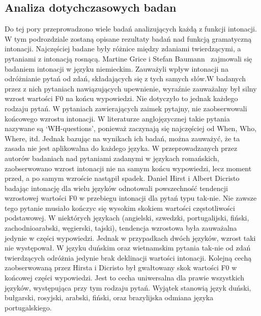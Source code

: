 \documentclass[a4paper,12 pt]{report}
\begin{document}
 

\subsection{Analiza dotychczasowych badan}
Do tej pory przeprowadzono wiele badań analizujących każdą z funkcji intonacji. W tym podrozdziale zostaną opisane rezultaty badań nad funkcją gramatyczną intonacji. Najczęściej badane były różnice między zdaniami twierdzącymi, a pytaniami z intonacją rosnącą.
\leavevmode
\newline
Martine Grice i Stefan Baumann~\cite{GRI-BA} zajmowali się badaniem intonacji w języku niemieckim. Zauważyli wpływ intonacji na odróżnianie pytań od zdań, składających się z tych samych słów.W badanych przez z nich pytaniach nawiązujących upewnienie, wyraźnie zauważalny był silny wzrost wartości F0 na końcu wypowiedzi. Nie dotyczyło to jednak każdego rodzaju pytań. W pytaniach zawierających zaimek pytajny, nie zaobserwowali końcowego wzrostu intonacji. W literaturze anglojęzycznej takie pytania nazywane są `WH-questions', ponieważ zaczynają się najczęściej od When, Who, Where, itd. Jednak bazując na wynikach ich badań, można zauważyć, że ta zasada nie jest aplikowalna do każdego języka. W przeprowadzanych przez autorów badaniach nad pytaniami zadanymi w językach romańskich, zaobserwowano wzrost intonacji nie na samym końcu wypowiedzi, lecz moment przed, a po samym wzroście nastąpił spadek.
\leavevmode
\newline
Daniel Hirst i Albert Dicristo~\cite{INT-SYS} badając intonację dla wielu języków odnotowali powszechność tendencji wzrostowej wartości F0 w przebiegu intonacji dla pytań typu tak-nie. Nie zawsze tego pytanie musiało kończyc się wysokim skokiem wartości częstotliwości podstawowej. W niektórych językach (angielski, szwedzki, portugalijski, fiński, zachodnioarabski, węgierski, tajski), tendencja wzrostowa była zauważalna jedynie w części wypowiedzi.
Jednak w przypadkach dwóch języków, wzrost taki nie występował. W języku duńskim oraz wietnamskim pytania tak-nie od zdań twierdzących odróżnia jedynie brak deklinacji wartości intonacji.
\newline Kolejną cechą zaobserwowaną przez Hirsta i Dicristo był gwałtowany skok wartości F0 w końcowej części wypowiedzi. Jest to cecha uniwersalna dla prawie wszystkich języków, występująca przy tym rodzaju pytań. Wyjątek stanowią język duński, bułgarski, rosyjski, arabski, fiński, oraz brazylijska odmiana języka portugalskiego.
\leavevmode
\newline
\end{document}
